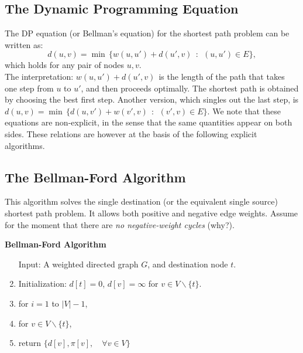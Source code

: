 \subsection{The Dynamic Programming Equation}
The DP equation (or Bellman's equation) for the shortest path problem can be written as:
\[d(u,v) = \min \,\{ w(u,u') + d(u',v)\,\;:\,\;(u,u') \in E\}, \]
which holds for any pair of nodes $u,v$.
\\
The interpretation: $w(u,u') + d(u',v)\,\;$is the length of the path that takes one step from $u$ to $u'$, and then proceeds optimally. The shortest path is obtained by choosing the best first step.
Another version, which singles out the last step, is
$d(u,v) = \min \,\{ d(u,v') + w(v',v)\,\;:\,\;(v',v) \in E\} $.
We note that these equations are non-explicit, in the sense that the same quantities appear on both sides.  These relations are however at the basis of the following explicit algorithms.

\subsection{The Bellman-Ford Algorithm}
This algorithm solves the single destination (or the equivalent single source) shortest path problem. It allows both positive and negative edge weights. Assume for the moment that there are \emph{no negative-weight cycles} (why?).

\begin{algorithm_}\textbf{Bellman-Ford Algorithm}
\begin{enumerate}
\item[ Input: ] A weighted directed graph $G$, and destination node $t$.

\item Initialization:   $d[t] = 0$,  $d[v] = \infty $ for $v \in V\backslash \{ t\} $.
                           \\

\item for  $i = 1$ to $|V| - 1$,




\item for  $v \in V\backslash \{ t\} $,





\item return $\{ d[v],\pi [v], \quad  \forall v \in V\} $
\end{enumerate}
\end{algorithm_}

